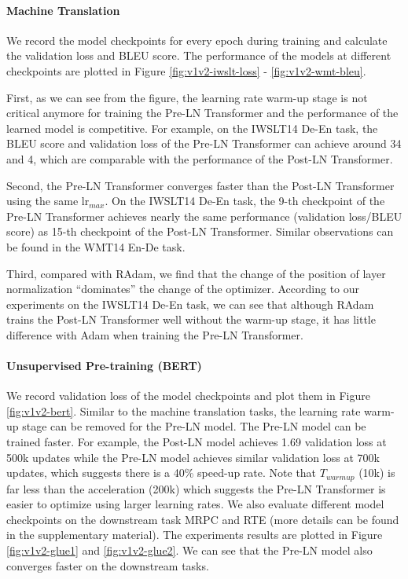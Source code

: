 \documentclass{article}
\begin{document}
\paragraph{Machine Translation}
We record the model checkpoints for every epoch during training and calculate the validation loss and BLEU score.  The performance of the models at different checkpoints are plotted in Figure \ref{fig:v1v2-iwslt-loss} - \ref{fig:v1v2-wmt-bleu}. 

First, as we can see from the figure, the learning rate warm-up stage is not critical anymore for training the Pre-LN Transformer and the performance of the learned model is competitive. For example, on the IWSLT14 De-En task, the BLEU score and validation loss of the Pre-LN Transformer can achieve around 34 and 4, which are comparable with the performance of the Post-LN Transformer. 

Second, the Pre-LN Transformer converges faster than the Post-LN Transformer using the same $\text{lr}_{max}$. On the IWSLT14 De-En task, the 9-th checkpoint of the Pre-LN Transformer achieves nearly the same performance (validation loss/BLEU score) as 15-th checkpoint of the Post-LN Transformer. Similar observations can be found in the WMT14 En-De task. %

Third, compared with RAdam, we find that the change of the position of layer normalization ``dominates'' the change of the optimizer. According to our experiments on the IWSLT14 De-En task, we can see that although RAdam trains the Post-LN Transformer well without the warm-up stage, it has little difference with Adam when training the Pre-LN Transformer.  

\paragraph{Unsupervised Pre-training (BERT)}


We record validation loss of the model checkpoints and plot them in Figure \ref{fig:v1v2-bert}. Similar to the machine translation tasks, the learning rate warm-up stage can be removed for the Pre-LN model. The Pre-LN model can be trained faster. For example, the Post-LN model achieves 1.69 validation loss at 500k updates while the Pre-LN model achieves similar validation loss at 700k updates, which suggests there is a 40\% speed-up rate. Note that $T_{warmup}$ (10k) is far less than the acceleration (200k) which suggests the Pre-LN Transformer is easier to optimize using larger learning rates. We also evaluate different model checkpoints on the downstream task MRPC and RTE (more details can be found in the supplementary material). The experiments results are plotted in Figure \ref{fig:v1v2-glue1} and \ref{fig:v1v2-glue2}. We can see that the Pre-LN model also converges faster on the downstream tasks.
\end{document}
